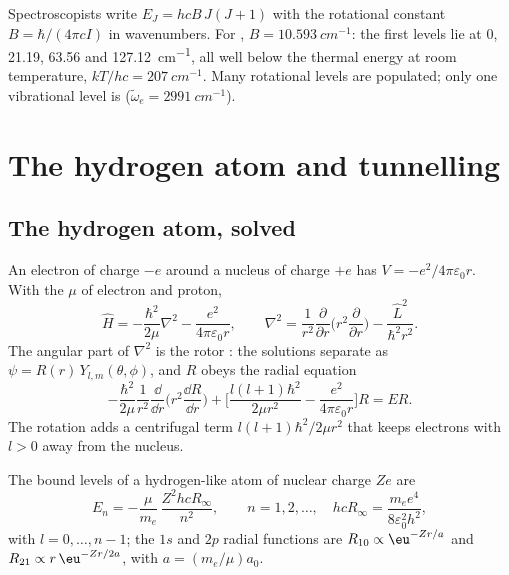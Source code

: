 \begin{example}\label{ex:b3:quantum-model-systems:hcl}
Spectroscopists write $E_J = hcB\,J(J+1)$ with the rotational constant $B =
\hbar/(4\pi cI)$ in wavenumbers. For , $B = \qty{10.593}{cm^{-1}}$:
the first levels lie at 0, 21.19, 63.56 and \qty{127.12}{cm^{-1}}, all well
below the thermal energy at room temperature, $kT/hc = \qty{207}{cm^{-1}}$.
Many rotational levels are populated; only one vibrational level is
($\tilde\omega_e = \qty{2991}{cm^{-1}}$).
\end{example}

\section{The hydrogen atom and tunnelling}

\subsection*{The hydrogen atom, solved}

An electron of charge $-e$ around a nucleus of charge $+e$ has $V = -e^2/
4\pi\varepsilon_0r$. With the  $\mu$ of electron and proton,
\[
\hat H = -\frac{\hbar^2}{2\mu}\nabla^2 - \frac{e^2}{4\pi\varepsilon_0r},\qquad
\nabla^2 = \frac{1}{r^2}\frac{\partial}{\partial r}\Big(r^2\frac{\partial}{
\partial r}\Big) - \frac{\hat L^2}{\hbar^2r^2}.
\]
The angular part of $\nabla^2$ is the rotor : the solutions
separate as $\psi = R(r)\,Y_{l,m}(\theta,\phi)$, and $R$ obeys the radial
equation
\[
-\frac{\hbar^2}{2\mu}\frac{1}{r^2}\frac{\dd}{\dd r}\Big(r^2\frac{\dd R}{\dd r}
\Big) + \Big[\frac{l(l+1)\hbar^2}{2\mu r^2} - \frac{e^2}{4\pi\varepsilon_0r}
\Big]R = ER.
\]
The rotation adds a centrifugal term $l(l+1)\hbar^2/2\mu r^2$ that keeps
electrons with $l > 0$ away from the nucleus.

\begin{theorem}\label{thm:b3:quantum-model-systems:hydrogen}
The bound levels of a hydrogen-like atom of nuclear charge $Ze$ are
\[
E_n = -\frac{\mu}{m_e}\,\frac{Z^2hcR_\infty}{n^2}, \qquad n = 1, 2, \dots,
\quad hcR_\infty = \frac{m_ee^4}{8\varepsilon_0^2h^2},
\]
with $l = 0, \dots, n - 1$; the $1s$ and $2p$ radial functions are $R_{10}
\propto \eu^{-Zr/a}$ and $R_{21} \propto r\,\eu^{-Zr/2a}$, with $a =
(m_e/\mu)a_0$.
\end{theorem}


